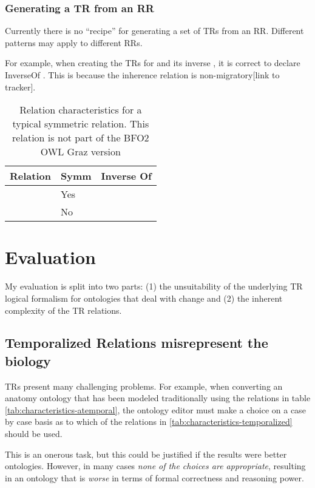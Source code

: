 \documentclass{bioinfo}
\def\adjacentTo{\pr{adjacent\_to}}
\def\atAllTimes{\pr{at-all-times}}
\def\atSomeTimes{\pr{at-some-times}}
\begin{document}
\subsubsection{Generating a TR from an RR}

Currently there is no ``recipe'' for generating a set of TRs from an
RR. Different patterns may apply to different RRs.

For example, when creating the TRs for  and its inverse
, it is correct to declare 
InverseOf . This is because the inherence
relation is non-migratory[link to tracker].

\begin{table}
\begin{tabular}{ | p{3cm} | p{1cm} | p{4cm} | }
\hline
\textbf{Relation} & \textbf{Symm} & \textbf{Inverse Of}  \\
\hline
\adjacentTo\ \atSomeTimes & Yes & \adjacentTo\ \atSomeTimes \\
\hline
\adjacentTo\ \atAllTimes & No & \\
\hline
\end{tabular}
\caption{Relation characteristics for a typical symmetric relation. This relation is not part of the BFO2 OWL Graz version}
\label{tab:characteristics-adj}
\end{table}

\section{Evaluation}

My evaluation is split into two parts: (1) the unsuitability of the
underlying TR logical formalism for ontologies that deal with change
and (2) the inherent complexity of the TR relations.

\subsection{Temporalized Relations misrepresent the biology}

TRs present many challenging problems. For example, when converting an
anatomy ontology that has been modeled traditionally using the
relations in table \ref{tab:characteristics-atemporal}, the ontology
editor must make a choice on a case by case basis as to which of
the relations in \ref{tab:characteristics-temporalized} should be
used.

This is an onerous task, but this could be justified if the results
were better ontologies. However, in many cases \emph{none of the
  choices are appropriate}, resulting in an ontology that is
\emph{worse} in terms of formal correctness and reasoning power.
\end{document}

